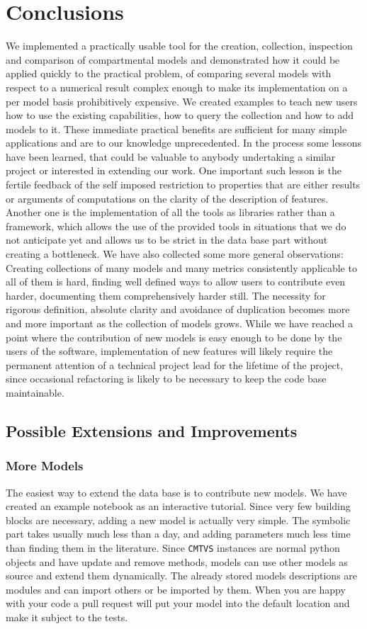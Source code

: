 \section{Conclusions} \label{sec:ConclusionsAndOutlook}
We implemented a
practically usable tool for the creation, collection, inspection and comparison
of compartmental models and demonstrated how it could be applied quickly to the
practical problem, of comparing several models with respect to a numerical
result complex enough to make its implementation on a per model basis
prohibitively expensive.  We created examples to teach new users how to use the
existing capabilities, how to query the collection and how to add models to it.
These immediate practical benefits are sufficient for many simple applications and
are to our knowledge unprecedented.  In the process some lessons have been
learned, that could be valuable to anybody undertaking a similar project or
interested in extending our work. 
One important such lesson is the fertile feedback of
the self imposed restriction to properties that are either results or arguments
of computations on the clarity of the description of features.  Another one is
the implementation of all the tools as libraries rather than a framework, which
allows the use of the provided tools in situations that we do not anticipate yet
and allows us to be strict in the data base part without creating a bottleneck.
We have also collected some more general observations: Creating collections of
many models and many metrics consistently applicable to all of them is hard,
finding well defined ways to allow users to contribute even harder, documenting
them comprehensively harder still.  The necessity for rigorous definition,
absolute clarity and avoidance of duplication becomes more and more important
as the collection of models grows.  While we have reached a point where the
contribution of new models is easy enough to be done by the users of the
software, implementation of new features will likely
require the permanent attention of a technical project lead for 
the lifetime of the project, since occasional refactoring is likely to be necessary
to keep the code base maintainable.
\subsection{Possible Extensions and Improvements}
\subsubsection{More Models}
The easiest way to extend the data base is to contribute new models.
We have created an example notebook as an interactive tutorial.
Since very few building blocks are necessary, adding a new model is actually very simple.
The symbolic part takes usually much less than a day, 
and adding parameters much less time than finding them in the literature.
Since \texttt{CMTVS} instances are normal python objects and have update and remove methods, models can use other models as source and extend them dynamically.
The already stored models descriptions are \python{} modules and can import others or be imported by them.
When you are happy with your code a pull request will put your model into the default location 
and make it subject to the tests. 
